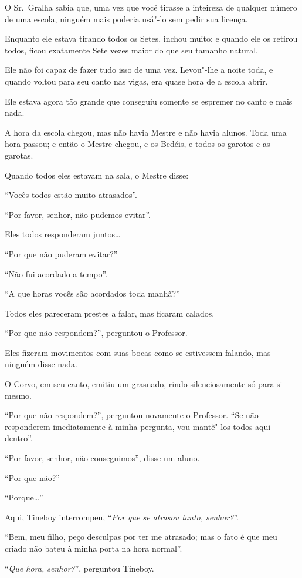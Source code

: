 O Sr.~Gralha sabia que, uma vez que você tirasse a inteireza de qualquer
número de uma escola, ninguém mais poderia usá"-lo sem pedir sua licença.

Enquanto ele estava tirando todos os Setes, inchou muito; e quando ele
os retirou todos, ficou exatamente Sete vezes maior do que seu
tamanho natural.

Ele não foi capaz de fazer tudo isso de uma vez. Levou"-lhe a noite toda,
e quando voltou para seu canto nas vigas, era quase hora de a escola
abrir.

Ele estava agora tão grande que conseguiu somente se espremer no canto e
mais nada.

A hora da escola chegou, mas não havia Mestre e não havia alunos. Toda
uma hora passou; e então o Mestre chegou, e os Bedéis, e todos os
garotos e as garotas.

Quando todos eles estavam na sala, o Mestre disse:

``Vocês todos estão muito atrasados''.

``Por favor, senhor, não pudemos evitar''.

Eles todos responderam juntos…

``Por que não puderam evitar?''

``Não fui acordado a tempo''.

``A que horas vocês são acordados toda manhã?''

Todos eles pareceram prestes a falar, mas ficaram calados.

``Por que não respondem?'', perguntou o Professor.

Eles fizeram movimentos com suas bocas como se estivessem falando, mas ninguém
disse nada.

O Corvo, em seu canto, emitiu um grasnado, rindo silenciosamente só para
si mesmo.

``Por que não respondem?'', perguntou novamente o Professor. ``Se não
responderem imediatamente à minha pergunta, vou mantê"-los todos aqui
dentro''.

``Por favor, senhor, não conseguimos'', disse um aluno.

``Por que não?''

``Porque…''

Aqui, Tineboy interrompeu, ``\emph{Por que se atrasou tanto, senhor?}''.

``Bem, meu filho, peço desculpas por ter me atrasado; mas o fato é que
meu criado não bateu à minha porta na hora normal''.

``\emph{Que hora, senhor?}'', perguntou Tineboy.

